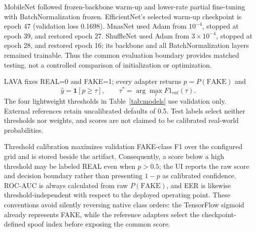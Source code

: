 \documentclass[10pt,journal,onecolumn,a4paper]{IEEEtran}
\begin{document}
MobileNet followed frozen-backbone warm-up and lower-rate partial fine-tuning with BatchNormalization frozen. EfficientNet's selected warm-up checkpoint is epoch 47 (validation loss 0.1698). MnasNet used Adam from $10^{-4}$, stopped at epoch 39, and restored epoch 27. ShuffleNet used Adam from $3\times10^{-4}$, stopped at epoch 28, and restored epoch 16; its backbone and all BatchNormalization layers remained trainable. Thus the common evaluation boundary provides matched testing, not a controlled comparison of initialization or optimization.

LAVA fixes REAL=0 and FAKE=1; every adapter returns $p=P(\mathrm{FAKE})$ and
\begin{equation}
\hat y=\mathbf{1}[p\ge\tau],\qquad \tau^*=\arg\max_{\tau}F1_{val}(\tau).
\label{eq:decision}
\end{equation}
The four lightweight thresholds in Table~\ref{tab:models} use validation only. External references retain uncalibrated defaults of 0.5. Test labels select neither thresholds nor weights, and scores are not claimed to be calibrated real-world probabilities.

Threshold calibration maximizes validation FAKE-class F1 over the configured grid and is stored beside the artifact. Consequently, a score below a high threshold may be labeled REAL even when $p>0.5$; the UI reports the raw score and decision boundary rather than presenting $1-p$ as calibrated confidence. ROC-AUC is always calculated from raw $P(\mathrm{FAKE})$, and EER is likewise threshold-independent with respect to the deployed operating point. These conventions avoid silently reversing native class orders: the TensorFlow sigmoid already represents FAKE, while the reference adapters select the checkpoint-defined spoof index before exposing the common score.
\end{document}
